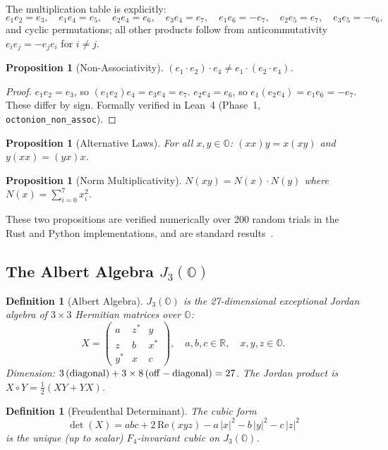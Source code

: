 \documentclass[11pt,letterpaper]{article}
\newtheorem{definition}[theorem]{Definition}
\newtheorem{proposition}[theorem]{Proposition}
\theoremstyle{definition}
\begin{document}
The multiplication table is explicitly:
\[
e_1e_2 = e_3,\quad e_1e_4 = e_5,\quad e_2e_4 = e_6,\quad e_3e_4 = e_7,\quad
e_1e_6 = -e_7,\quad e_2e_5 = e_7,\quad e_3e_5 = -e_6,
\]
and cyclic permutations; all other products follow from anticommutativity
$e_ie_j = -e_je_i$ for $i \neq j$.

\begin{proposition}[Non-Associativity]\label{prop:non-assoc}
$(e_1 \cdot e_2) \cdot e_4 \neq e_1 \cdot (e_2 \cdot e_4)$.
\end{proposition}
\begin{proof}
$e_1 e_2 = e_3$, so $(e_1e_2)e_4 = e_3e_4 = e_7$.
$e_2 e_4 = e_6$, so $e_1(e_2e_4) = e_1e_6 = -e_7$.
These differ by sign. Formally verified in Lean~4 (Phase~1, \texttt{octonion\_non\_assoc}).
\end{proof}

\begin{proposition}[Alternative Laws]
For all $x,y \in \mathbb{O}$: $(xx)y = x(xy)$ and $y(xx) = (yx)x$.
\end{proposition}

\begin{proposition}[Norm Multiplicativity]
$N(xy) = N(x) \cdot N(y)$ where $N(x) = \sum_{i=0}^7 x_i^2$.
\end{proposition}

These two propositions are verified numerically over 200 random trials in the
Rust and Python implementations, and are standard results~\cite{conway_smith2003}.

\subsection{The Albert Algebra $J_3(\mathbb{O})$}

\begin{definition}[Albert Algebra]
$J_3(\mathbb{O})$ is the 27-dimensional \emph{exceptional Jordan algebra} of
$3 \times 3$ Hermitian matrices over $\mathbb{O}$:
\[
X = \begin{pmatrix} a & z^* & y \\ z & b & x^* \\ y^* & x & c \end{pmatrix},
\quad a,b,c \in \mathbb{R},\quad x,y,z \in \mathbb{O}.
\]
Dimension: $3\,({\rm diagonal}) + 3 \times 8\,({\rm off-diagonal}) = 27$.
The Jordan product is $X \circ Y = \frac{1}{2}(XY + YX)$.
\end{definition}

\begin{definition}[Freudenthal Determinant]
\label{def:det}
The cubic form
\[
\det(X) = abc + 2\,\mathrm{Re}(xyz) - a\,|x|^2 - b\,|y|^2 - c\,|z|^2
\]
is the unique (up to scalar) $F_4$-invariant cubic on $J_3(\mathbb{O})$.
\end{definition}
\end{document}

